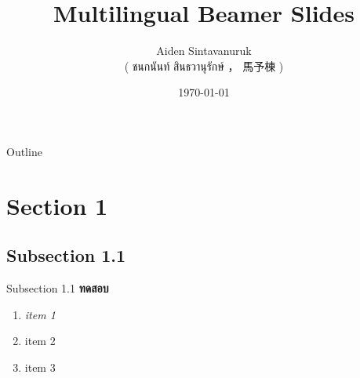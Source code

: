 \documentclass{beamer}
\title{Multilingual Beamer Slides}
\author[shortname]{
	Aiden Sintavanuruk \\ ( ชนกนันท์ สินธวานุรักษ์ ， 馬予棟 ) \inst{1}
}
\institute[shortinst]{\inst{1} affiliation
}
\date{\today}
\begin{document}
\begin{frame}
	\titlepage
\end{frame}

\begin{frame}{Outline}
	\tableofcontents
\end{frame}


\section{Section 1}
\subsection{Subsection 1.1}
\begin{frame}{Subsection 1.1}
	\textbf{ทดสอบ} \cite{hormander_hypoelliptic_1967}
	\begin{enumerate}
		\item<1-> \textit{item 1}
		\item<2-> item 2
		\item<3-> item 3
	\end{enumerate}
\end{frame}

\begin{frame}
\end{frame}

\begin{frame}[allowframebreaks]
	
	\tiny
\end{frame}
\end{document}
